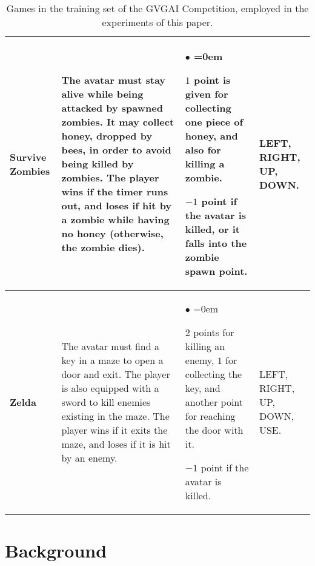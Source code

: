 \documentclass[conference]{IEEEtran}
\begin{document}
\begin{table*}[!t]
\begin{center}
\begin{tabular}{|m{1.4cm}|m{8cm}|m{5cm}|m{1cm}|}
\hline
\textbf{Survive Zombies} & The avatar must stay alive while being attacked by spawned zombies. It may collect honey, dropped by bees, in order to avoid being killed by zombies. The player wins if the timer runs out, and loses if hit by a zombie while having no honey (otherwise, the zombie dies).& \begin{list}{$\bullet$}{\leftmargin=2pt \itemindent=0em} \item $1$ point is given for collecting one piece of honey, and also for killing a zombie. \item $-1$ point if the avatar is killed, or it falls into the zombie spawn point. \end{list} & LEFT, RIGHT, UP, DOWN.\\
\hline
\textbf{Zelda} & The avatar must find a key in a maze to open a door and exit. The player is also equipped with a sword to kill enemies existing in the maze. The player wins if it exits the maze, and loses if it is hit by an enemy. & \begin{list}{$\bullet$}{\leftmargin=2pt \itemindent=0em} \item $2$ points for killing an enemy, $1$ for collecting the key, and another point for reaching the door with it. \item $-1$ point if the avatar is killed. \end{list} & LEFT, RIGHT, UP, DOWN, USE. \\
\hline
\end{tabular}
\caption{Games in the training set of the GVGAI Competition, employed in the experiments of this paper.}
\label{tab:games}
\end{center}
\end{table*}






\section{Background} \label{sec:fastEvo}
\end{document}
